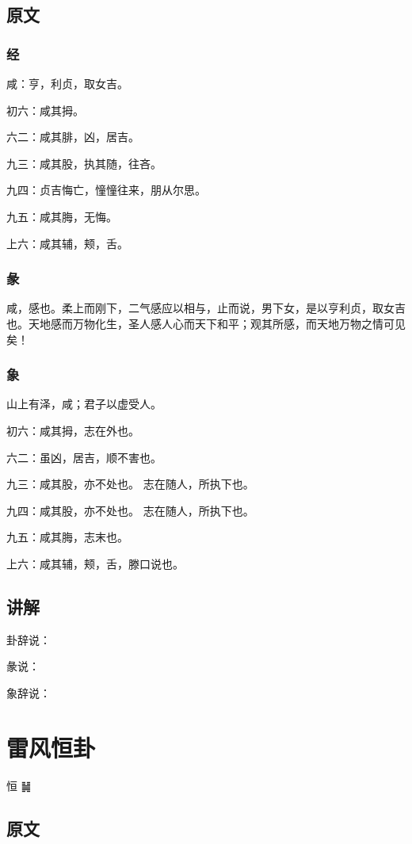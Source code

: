 \documentclass[12pt,oneside]{book}
\begin{document}
\section{原文}

\subsection{经}
咸：亨，利贞，取女吉。

初六：咸其拇。

六二：咸其腓，凶，居吉。

九三：咸其股，执其随，往吝。

九四：贞吉悔亡，憧憧往来，朋从尔思。

九五：咸其脢，无悔。

上六：咸其辅，颊，舌。

\subsection{彖}
咸，感也。柔上而刚下，二气感应以相与，止而说，男下女，是以亨利贞，取女吉也。天地感而万物化生，圣人感人心而天下和平；观其所感，而天地万物之情可见矣！

\subsection{象}
山上有泽，咸；君子以虚受人。

初六：咸其拇，志在外也。

六二：虽凶，居吉，顺不害也。

九三：咸其股，亦不处也。 志在随人，所执下也。

九四：咸其股，亦不处也。 志在随人，所执下也。

九五：咸其脢，志末也。

上六：咸其辅，颊，舌，滕口说也。

\section{讲解}
卦辞说：

彖说：

象辞说：

\chapter{雷风恒卦}
恒 {\Large ䷟}

\section{原文}
\end{document}
